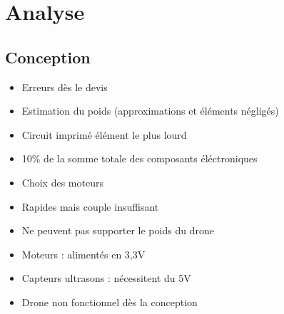 \documentclass{beamer}
\begin{document}
{	\begin{frame} %
	  \par
	\end{frame}
  }
  
  {
    \section{Analyse}
    
      \begin{frame}
	\tableofcontents[hideothersubsections]
      \end{frame}
      
      \subsection{Conception}
	\begin{frame}
	  \begin{itemize}
	    \item Erreurs dès le devis
	    \item Estimation du poids (approximations et éléments négligés)
	    \item Circuit imprimé élément le plus lourd
	    \item 10\% de la somme totale des composants éléctroniques
	  \end{itemize}
	\end{frame}
	
	\begin{frame}
	  \begin{itemize}
	    \item Choix des moteurs
	    \item Rapides mais couple insuffisant
	    \item Ne peuvent pas supporter le poids du drone
	  \end{itemize}
	\end{frame}
	
	\begin{frame}
	  \begin{itemize}
	    \item Moteurs : alimentés en 3,3V
	    \item Capteurs ultrasons : nécessitent du 5V
	    \item Drone non fonctionnel dès la conception
	  \end{itemize}
	\end{frame}
	
}
\end{document}

